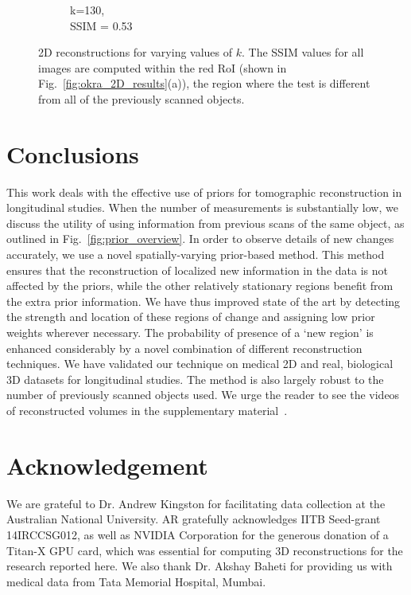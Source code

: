 \documentclass[journal]{IEEEtran}
\begin{document}
\begin{figure}[h]
\begin{subfigure}[b]{0.24\linewidth}
        \caption{k=130,\\ SSIM = 0.53}
     \end{subfigure}
    \caption{2D reconstructions for varying values of $k$. The SSIM values for all images are computed within the red RoI (shown in Fig.~\ref{fig:okra_2D_results}(a)), the region where the test is different from all of the previously scanned objects.}
\label{fig:reconstructions_as_k_varies}
\end{figure}


\section{Conclusions}
\label{sec:conclusions}
This work deals with the effective use of priors for tomographic
reconstruction in longitudinal studies. When the number of measurements is
substantially low, we discuss the utility of
using information from previous scans of the same object, as outlined in
Fig.~\ref{fig:prior_overview}. In order to observe details of new changes
accurately, we use a novel
spatially-varying prior-based method. This method ensures that the
reconstruction of localized new information in the data is not
affected by the priors, while the other relatively stationary regions benefit from the extra prior information. %
We have thus
improved state of the art by detecting the strength and location
of these regions of change and
assigning low prior weights wherever necessary. The probability of
presence of a `new region' is enhanced considerably by a novel
combination of different reconstruction techniques.  We have validated
our technique on medical 2D and real, biological 3D datasets for
longitudinal studies. The method is also largely robust to the number
of previously scanned objects used. We urge the reader to see the
videos of reconstructed volumes in the supplementary
material~\cite{supp_paper}.

\section{Acknowledgement}
We are grateful to Dr. Andrew Kingston for facilitating data
collection at the Australian National University. AR gratefully
acknowledges IITB Seed-grant 14IRCCSG012, as well as NVIDIA
Corporation for the generous donation of a Titan-X GPU card, which was
essential for computing 3D reconstructions for the research reported
here. We also thank Dr. Akshay Baheti for providing us with medical
data from Tata Memorial Hospital, Mumbai.
{%
}
\end{document}
